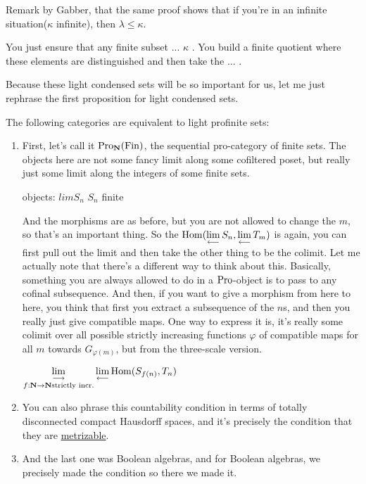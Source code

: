 \begin{example}
\begin{remark}
Remark by Gabber, that the same proof shows that if you're in an infinite situation($\kappa$ infinite), then $\lambda \leq \kappa$.
\end{remark}

You just ensure that any finite subset ... $\kappa$ . You build a finite quotient where these elements are distinguished and then take the ... .

Because these light condensed sets will be so important for us, let me just rephrase the first proposition for light condensed sets. 

\begin{proposition}
The following categories are equivalent to light profinite sets:
\begin{enumerate}
\item First, let's call it $\operatorname{Pro}_\mathbf N(\operatorname{Fin})$, the sequential pro-category of finite sets. The objects here are not some fancy limit along some cofiltered poset, but really just some limit along the integers of some finite sets. 

objects: $lim S_n$ $S_n$ finite

And the morphisms are as before, but you are not allowed to change the $m$, so that's an important thing. So the $\operatorname{Hom}(\mathop{\operatorname*{lim}\limits_{\longleftarrow}}\limits S_n, \mathop{\operatorname*{lim}\limits_{\longleftarrow}}\limits T_m)$ is again, you can first pull out the limit and then take the other thing to be the colimit. 
Let me actually note that there's a different way to think about this. Basically, something you are always allowed to do in a $\operatorname{Pro}$-object is to pass to any cofinal subsequence. And then, if you want to give a morphism from here to here, you think that first you extract a subsequence of the $n$s, and then you really just give compatible maps. One way to express it is, it's really some colimit over all possible strictly increasing functions $\varphi$ of compatible maps for all $m$ towards $G_{\varphi(m)}$, but from the three-scale version.

$\mathop{\operatorname*{lim}\limits_{\longrightarrow}}\limits_{f: \mathbf N \to \mathbf N \text{strictly incr.}} \mathop{\operatorname*{lim}\limits_{\longleftarrow}}\limits \operatorname{Hom}(S_{f(n)}, T_n)$ 


\item You can also phrase this countability condition in terms of totally disconnected compact Hausdorff spaces, and it's precisely the condition that they are \underline{metrizable}. 

\item And the last one was Boolean algebras, and for Boolean algebras, we precisely made the condition so there we made it.


\end{enumerate}
\end{proposition}
\end{example}
